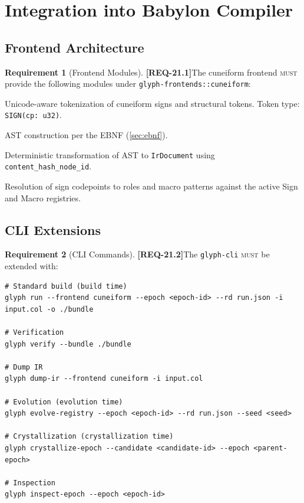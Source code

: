 \documentclass[11pt,a4paper,twoside]{article}
\theoremstyle{definition}
\newtheorem{requirement}{Requirement}[section]
\theoremstyle{remark}
\newcommand{\req}[1]{\textbf{\textcolor{reqred}{[REQ-#1]}}}
\newcommand{\must}{\textsc{must}}
\begin{document}

\section{Integration into Babylon Compiler}
\label{sec:integration}

\subsection{Frontend Architecture}

\begin{requirement}[Frontend Modules]
\label{req:frontend-modules}
\req{21.1}\quad The cuneiform frontend \must{} provide the following modules under \texttt{glyph-frontends::cuneiform}:
\begin{description}[nosep,leftmargin=3cm]
  \item[\texttt{lexer}] Unicode-aware tokenization of cuneiform signs and structural tokens. Token type: \texttt{SIGN(cp: u32)}.
  \item[\texttt{parser}] AST construction per the EBNF (\cref{sec:ebnf}).
  \item[\texttt{lower}] Deterministic transformation of AST to \texttt{IrDocument} using \texttt{content\_hash\_node\_id}.
  \item[\texttt{registry\_adapter}] Resolution of sign codepoints to roles and macro patterns against the active Sign and Macro registries.
\end{description}
\end{requirement}

\subsection{CLI Extensions}

\begin{requirement}[CLI Commands]
\label{req:cli}
\req{21.2}\quad The \texttt{glyph-cli} \must{} be extended with:
\end{requirement}

\begin{lstlisting}[caption={COL CLI Surface}]
# Standard build (build time)
glyph run --frontend cuneiform --epoch <epoch-id> --rd run.json -i input.col -o ./bundle

# Verification
glyph verify --bundle ./bundle

# Dump IR
glyph dump-ir --frontend cuneiform -i input.col

# Evolution (evolution time)
glyph evolve-registry --epoch <epoch-id> --rd run.json --seed <seed>

# Crystallization (crystallization time)
glyph crystallize-epoch --candidate <candidate-id> --epoch <parent-epoch>

# Inspection
glyph inspect-epoch --epoch <epoch-id>
\end{lstlisting}
\end{document}
